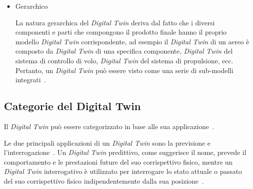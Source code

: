 \begin{itemize}
    \item Gerarchico
    
    La natura gerarchica del \emph{Digital Twin} deriva dal fatto che i diversi componenti e parti che compongono il prodotto finale hanno il proprio modello \emph{Digital Twin} corrispondente, ad esempio il \emph{Digital Twin} di un aereo è composto da \emph{Digital Twin} di una specifica componente, \emph{Digital Twin} del sistema di controllo di volo, \emph{Digital Twin} del sistema di propulsione, ecc. Pertanto, un \emph{Digital Twin} può essere visto come una serie di sub-modelli integrati~\cite{Gerarchico}.
    
\end{itemize}

\subsection{Categorie del Digital Twin}
Il \emph{Digital Twin} può essere categorizzato in base alle sua applicazione~\cite{Economico}.

Le due principali applicazioni di un \emph{Digital Twin} sono la previsione e l'interrogazione~\cite{Economico}.
Un \emph{Digital Twin} predittivo, come suggerisce il nome, prevede il comportamento e le prestazioni future del suo corrispettivo fisico, mentre un \emph{Digital Twin} interrogativo è utilizzato per interrogare lo stato attuale o passato del suo corrispettivo fisico indipendentemente dalla sua posizione~\cite{Categoria}.

\newpage

